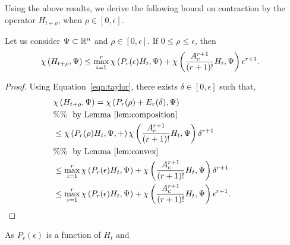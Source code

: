 Using the above results, we derive the following bound on contraction
by the operator $H_{t+\rho}$, when $\rho\in[0,\epsilon]$.
%
\begin{lemma}\label{lem:conv}
Let us consider $\Psi\subset\mathbb{R}^n$ and $\rho\in[0,\epsilon]$.  If
$0\leq \rho\leq \epsilon$, then
%
\begin{align*}
& \chi\left(H_{t+\rho},\Psi\right)\leq\max_{i=1}^r\chi\left(P_r(\epsilon)H_t,\Psi\right)+\chi\left(\frac{A_c^{r+1}}{(r+1)!}H_t,\Psi\right)\epsilon^{r+1}.
\end{align*}
%
\end{lemma}
%
\begin{proof}
Using Equation~\ref{eqn:taylor}, there exists
$\delta\in[0,\epsilon]$ such that,
%
\begin{align*}
&
  \chi\left(H_{t+\rho},\Psi\right)=\chi\left(P_r(\rho)+E_r(\delta),\Psi\right)\\
& \%\%~~\text{by Lemma~\ref{lem:composition}}\\
&
  \leq\chi\left(P_r(\rho)H_t,\Psi,+\right)\chi\left(\frac{A_c^{r+1}}{(r+1)!}H_t,\Psi\right)\delta^{r+1}\\
  & \%\%~~\text{by Lemma~\ref{lem:convex}}\\
&
  \leq\max_{i=1}^r\chi\left(P_r(\epsilon)H_t,\Psi\right)+\chi\left(\frac{A_c^{r+1}}{(r+1)!}H_t,\Psi\right)\delta^{r+1}\\
& \leq\max_{i=1}^r\chi\left(P_r(\epsilon)H_t,\Psi\right)+\chi\left(\frac{A_c^{r+1}}{(r+1)!}H_t,\Psi\right)\epsilon^{r+1}.\hspace{3em}\qedhere
\end{align*}
%
\end{proof}
%
As $P_r(\epsilon)$ is a function of $H_t$ and 
